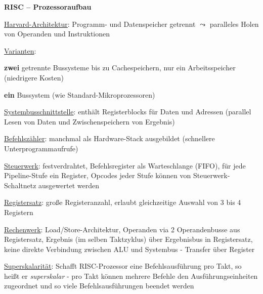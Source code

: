 \textbf{RISC -- Prozessoraufbau}
\begin{items}
	\item \underline{Harvard-Architektur}: Programm- und Datenspeicher getrennt $\leadsto$ paralleles Holen von Operanden und Instruktionen
	\item \underline{Varianten}:
	\begin{enumeration}
		\item \textbf{zwei} getrennte Bussysteme bis zu Cachespeichern, nur ein Arbeitsspeicher (niedrigere Kosten)
		\item \textbf{ein} Bussystem (wie Standard-Mikroprozessoren)
	\end{enumeration}
	\item \underline{Systembusschnittstelle}: enthält Registerblocks für Daten und Adressen (parallel Lesen von Daten und Zwischenspeichern von Ergebnis)
	\item \underline{Befehlszähler}: manchmal als Hardware-Stack ausgebildet (schnellere Unterprogrammaufrufe)
	\item \underline{Steuerwerk}: festverdrahtet, Befehlsregister als Warteschlange (FIFO), für jede Pipeline-Stufe ein Register, Opcodes jeder Stufe können von Steuerwerk-Schaltnetz ausgewertet werden
	\item \underline{Registersatz}: große Registeranzahl, erlaubt gleichzeitige Auswahl von 3 bis 4 Registern
	\item \underline{Rechenwerk}: Load/Store-Architektur, Operanden via 2 Operandenbusse aus Registersatz, Ergebnis (im selben Taktzyklus) über Ergebnisbus in Registersatz, keine direkte Verbindung zwischen ALU und Systembus - Transfer über Register
	\item \underline{Superskalarität}: Schafft RISC-Prozessor eine Befehlsausführung pro Takt, so heißt er \emph{superskalar} - pro Takt können mehrere Befehle den Ausführungseinheiten zugeordnet und so viele Befehlsausführungen beendet werden
\end{items}